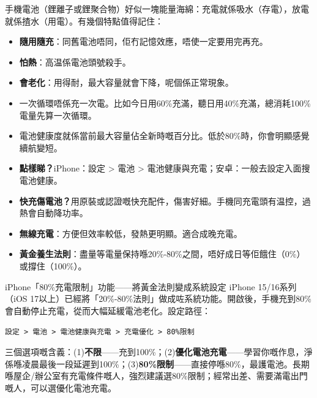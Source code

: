 


手機電池（鋰離子或鋰聚合物）好似一塊能量海綿：充電就係吸水（存電），放電就係揸水（用電）。有幾個特點值得記住：

\begin{itemize}
  \item \textbf{隨用隨充}：同舊電池唔同，佢冇記憶效應，唔使一定要用完再充。
  \item \textbf{怕熱}：高温係電池頭號殺手。
  \item \textbf{會老化}：用得耐，最大容量就會下降，呢個係正常現象。
\end{itemize}


\begin{itemize}
  \item 一次循環唔係充一次電。比如今日用60\%充滿，聽日用40\%充滿，總消耗100\%電量先算一次循環。
  \item 電池健康度就係當前最大容量佔全新時嘅百分比。低於80\%時，你會明顯感覺續航變短。
  \item \textbf{點樣睇？}iPhone：設定 > 電池 > 電池健康與充電；安卓：一般去設定入面搜電池健康。
\end{itemize}


\begin{itemize}
  \item \textbf{快充傷電池？}用原裝或認證嘅快充配件，傷害好細。手機同充電頭有温控，過熱會自動降功率。
  \item \textbf{無線充電}：方便但效率較低，發熱更明顯。適合成晚充電。
  \item \textbf{黃金養生法則}：盡量等電量保持喺20\%-80\%之間，唔好成日等佢餓住（0\%）或撐住（100\%）。
\end{itemize}

\begin{tcbinfo}{iPhone「80\%充電限制」功能——將黃金法則變成系統設定}
iPhone 15/16系列（iOS 17以上）已經將「20\%-80\%法則」做成咗系統功能。開啟後，手機充到80\%會自動停止充電，從而大幅延緩電池老化。設定路徑：

\texttt{設定 > 電池 > 電池健康與充電 > 充電優化 > 80\%限制}

三個選項嘅含義：(1)\textbf{不限}——充到100\%；(2)\textbf{優化電池充電}——學習你嘅作息，淨係喺凌晨最後一段延遲到100\%；(3)\textbf{80\%限制}——直接停喺80\%，最護電池。長期喺屋企/辦公室有充電條件嘅人，強烈建議選80\%限制；經常出差、需要滿電出門嘅人，可以選優化電池充電。

\end{tcbinfo}

